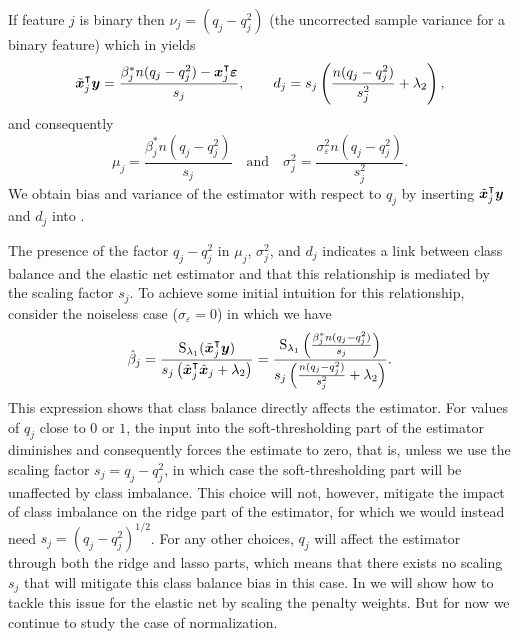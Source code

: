 If feature $j$ is binary then \(\nu_j = (q_j - q_j^2)\) (the uncorrected sample variance
for a binary feature) which in  yields
\begin{equation*}
  \tilde{\bm{x}}_j^\intercal \bm{y} = \frac{\beta_j^* n(q_j - q_j^2) - \bm{x}_j^\intercal \bm{\varepsilon}}{s_j}, \qquad
  d_j                          = s_j \left(\frac{n(q_j - q_j^2)}{s_j^2} + \lambda_2\right),
\end{equation*}
and consequently
\[
  \mu_j = \frac{\beta^*_j n(q_j - q_j^2)}{s_j}\quad \text{and} \quad \sigma_j^2 = \frac{\sigma_\varepsilon^2n(q_j- q_j^2)}{s^2_j}.
\]
%
We obtain bias and variance of the estimator with respect to \(q_j\) by inserting
\(\tilde{\bm{x}}_j^\intercal \bm{y}\) and \(d_j\) into .

The presence of the factor \(q_j - q_j^2\) in \(\mu_j\), \(\sigma_j^2\), and \(d_j\)
indicates a link between class balance and the elastic net estimator and that this
relationship is mediated by the scaling factor \(s_j\). To achieve some initial intuition
for this relationship, consider the noiseless case (\(\sigma_\varepsilon = 0\)) in which we
have
\begin{equation}
  \label{eq:noiseless-estimator}
  \hat{\beta}_j = \frac{\operatorname{S}_{\lambda_1}(\tilde{\bm{x}}_j^\intercal \bm{y})}{s_j\left(\tilde{\bm{x}}_j^\intercal \tilde{\bm{x}}_j + \lambda_2\right)}
  =
  \frac{\operatorname{S}_{\lambda_1}\left(\frac{\beta_j^* n (q_j - q_j^2)}{s_j}\right)}{s_j\left(\frac{n(q_j - q_j^2)}{s_j^2} + \lambda_2\right)}.
\end{equation}
%
This expression shows that class balance directly affects the estimator. For values of
\(q_j\) close to \(0\) or \(1\), the input into the soft-thresholding part of the estimator
diminishes and consequently forces the estimate to zero, that is, unless we use the scaling
factor \(s_j = q_j - q_j^2\), in which case the soft-thresholding part will be unaffected
by class imbalance. This choice will not, however, mitigate the impact of class imbalance
on the ridge part of the estimator, for which we would instead need \(s_j = (q_j -
q_j^2)^{1/2}\). For any other choices, \(q_j\) will affect the estimator through both the
ridge and lasso parts, which means that there exists no scaling \(s_j\) that will mitigate
this class balance bias in this case. In  we will show how to
tackle this issue for the elastic net by scaling the penalty weights. But for now we
continue to study the case of normalization.

